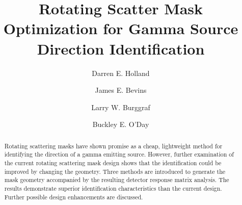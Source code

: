 \documentclass[3p,times]{elsarticle}
\begin{document}
\begin{frontmatter}



\dochead{}

\title{Rotating Scatter Mask Optimization for Gamma Source Direction Identification}


\author[d1]{Darren E. Holland}
\author[d2]{James E. Bevins}
\author[d3]{Larry W. Burggraf}
\author[d4]{Buckley E. O'Day}

\address[d1]{dholland@cedarville.edu\\
  Department of Mechanical Engineering\\
	Cedarville University \\
	Cedarville, OH\\}
	
\address[d2,d3,d4]{Department of Engineering Physics\\
	Air Force Institute of Technology \\
	Wright-Patterson AFB, OH\\}

\begin{abstract}
Rotating scattering masks have shown promise as a cheap, lightweight method for identifying the direction of a gamma emitting source.
However, further examination of the current rotating scattering mask design shows that the identification could be improved by changing the geometry.  
Three methods are introduced to generate the mask geometry accompanied by the resulting detector response matrix analysis.  
The results demonstrate superior identification characteristics than the current design.  
Further possible design enhancements are discussed.
\end{abstract}


\end{frontmatter}
\end{document}
